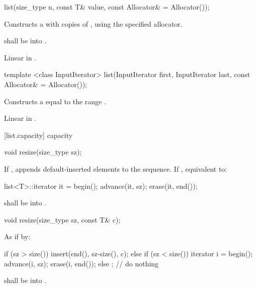 %
\begin{itemdecl}
list(size_type n, const T& value, const Allocator& = Allocator());
\end{itemdecl}

\begin{itemdescr}
\pnum
\effects
Constructs a
with
copies of
,
using the specified allocator.

\pnum
\requires {} shall be  into .

\pnum
\complexity
Linear in
.
\end{itemdescr}

%
\begin{itemdecl}
template <class InputIterator>
  list(InputIterator first, InputIterator last, const Allocator& = Allocator());
\end{itemdecl}

\begin{itemdescr}
\pnum
\effects
Constructs a
equal to the range
.

\pnum
\complexity
Linear in
.
\end{itemdescr}

[list.capacity]{ capacity}

%
\begin{itemdecl}
void resize(size_type sz);
\end{itemdecl}

\begin{itemdescr}
\pnum
\effects
If ,
appends  default-inserted elements to the
sequence.
If , equivalent to:

\begin{codeblock}
list<T>::iterator it = begin();
advance(it, sz);
erase(it, end());
\end{codeblock}


\pnum
\requires {} shall be
 into .
\end{itemdescr}

%
\begin{itemdecl}
void resize(size_type sz, const T& c);
\end{itemdecl}

\begin{itemdescr}
\pnum
\effects
As if by:
\begin{codeblock}
if (sz > size())
  insert(end(), sz-size(), c);
else if (sz < size()) {
  iterator i = begin();
  advance(i, sz);
  erase(i, end());
}
else
  ;                 // do nothing
\end{codeblock}

\pnum
\requires {} shall be  into .
\end{itemdescr}

